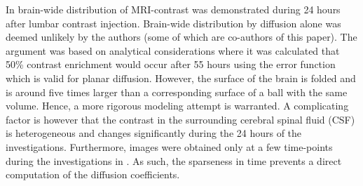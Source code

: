 \documentclass[11pt,a4paper]{article}
\newcommand{\kam}[1]{\textcolor{blue}{#1}}
\begin{document}

In \cite{ringstad2018brain} brain-wide distribution of MRI-contrast was demonstrated during 24 hours after lumbar contrast injection. Brain-wide distribution by diffusion alone was deemed unlikely by the authors (some of which are co-authors of this paper). The argument was based on analytical considerations where it was calculated that 50\% contrast enrichment would occur after 
55 hours using the error function which is valid for planar diffusion. However, 
the surface of the brain is folded and is around five times larger than 
a corresponding surface of a ball with the same volume. Hence, 
a more rigorous modeling attempt is warranted. A complicating factor
is however that the contrast in the surrounding cerebral spinal fluid (CSF) is heterogeneous
and changes significantly during the 24 hours of the investigations. 
Furthermore, images were obtained only at a few time-points during the investigations in \cite{ringstad2018brain}. As such, the sparseness in time prevents a direct computation of the diffusion coefficients.
\end{document}
